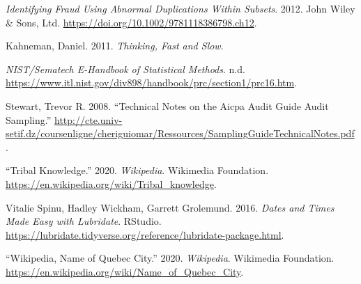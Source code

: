 \documentclass[
]{book}
\begin{document}
\leavevmode\hypertarget{ref-nigrini-forensicanalytics-ch12}{}%
\emph{Identifying Fraud Using Abnormal Duplications Within Subsets}. 2012. John Wiley \& Sons, Ltd. \url{https://doi.org/10.1002/9781118386798.ch12}.

\leavevmode\hypertarget{ref-cognitive-ease}{}%
Kahneman, Daniel. 2011. \emph{Thinking, Fast and Slow}.

\leavevmode\hypertarget{ref-outliers}{}%
\emph{NIST/Sematech E-Handbook of Statistical Methods}. n.d. \url{https://www.itl.nist.gov/div898/handbook/prc/section1/prc16.htm}.

\leavevmode\hypertarget{ref-sampling-technical}{}%
Stewart, Trevor R. 2008. ``Technical Notes on the Aicpa Audit Guide Audit Sampling.'' \url{http://cte.univ-setif.dz/coursenligne/cheriguiomar/Ressources/SamplingGuideTechnicalNotes.pdf}.

\leavevmode\hypertarget{ref-tribal-knowledge}{}%
``Tribal Knowledge.'' 2020. \emph{Wikipedia}. Wikimedia Foundation. \url{https://en.wikipedia.org/wiki/Tribal_knowledge}.

\leavevmode\hypertarget{ref-lubridate-help}{}%
Vitalie Spinu, Hadley Wickham, Garrett Grolemund. 2016. \emph{Dates and Times Made Easy with Lubridate}. RStudio. \url{https://lubridate.tidyverse.org/reference/lubridate-package.html}.

\leavevmode\hypertarget{ref-quebec}{}%
``Wikipedia, Name of Quebec City.'' 2020. \emph{Wikipedia}. Wikimedia Foundation. \url{https://en.wikipedia.org/wiki/Name_of_Quebec_City}.
\end{document}
